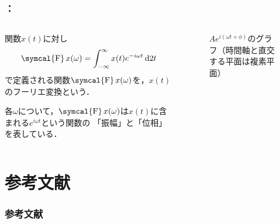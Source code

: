 \documentclass[unicode,11pt]{beamer}
\newcommand{\figurewidth}{5cm}
\newcommand{\termdef}[1]{\alert{\sffamily #1}}
\DeclareMathOperator{\ft}{\symcal{F}}
\newcommand{\intd}[1]{\dl2#1}
\begin{document}
\begin{frame}
  \frametitle{\secname ：\subsecname}
  \begin{columns}
    \begin{column}{0.6\textwidth}
      \begin{definition}[フーリエ変換]
        関数\(x(t)\)に対し
        \[
          \ft x(\omega) = \int_{-\infty}^\infty x(t)e^{-i\omega t}\intd{t}
        \]
        で定義される関数\(\ft x(\omega)\)を，\(x(t)\)の\termdef{フーリエ変換}という．
      \end{definition}
    
      各\(\omega\)について，\(\ft x(\omega)\)は\(x(t)\)に含まれる\(e^{i\omega t}\)という関数の
      「振幅」と「位相」を表している．    
    \end{column}
    \begin{column}{0.4\textwidth}
      \begin{figure}
        \centering
        \caption{\(Ae^{i(\omega t+\phi)}\)のグラフ（時間軸と直交する平面は複素平面）}
      \end{figure}
    \end{column}
  \end{columns}
\end{frame}

\section*{参考文献}
\begin{frame}[allowframebreaks]
  \frametitle{参考文献}
  \beamertemplatetextbibitems
  
  
\end{frame}
\end{document}

